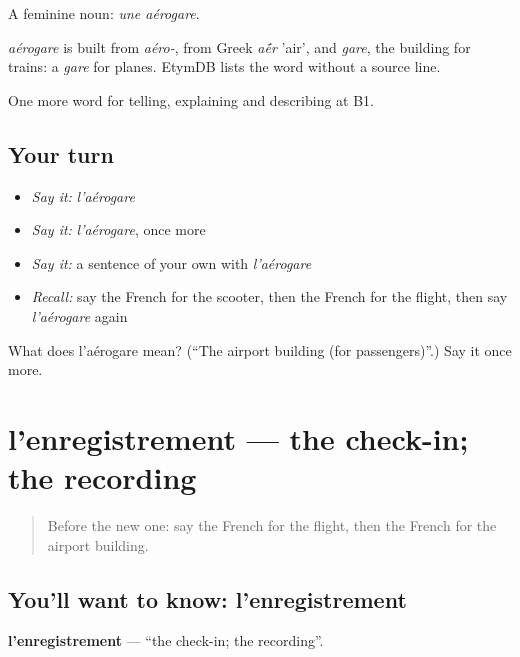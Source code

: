 A feminine noun: \emph{une aérogare}.

\begin{cousinweb}
\emph{aérogare} is built from \emph{aéro-}, from Greek \emph{a\'{\={e}}r} 'air', and \emph{gare}, the building for trains: a \emph{gare} for planes. EtymDB lists the word without a source line.
\end{cousinweb}

\begin{grammarlens}[title={What you've built}]
One more word for telling, explaining and describing at B1.
\end{grammarlens}

\subsection*{Your turn}
\begin{itemize}
\raggedright
  \item \emph{Say it:} \emph{l'aérogare}
  \item \emph{Say it:} \emph{l'aérogare}, once more
  \item \emph{Say it:} a sentence of your own with \emph{l'aérogare}
  \item \emph{Recall:} say the French for the scooter, then the French for the flight, then say \emph{l'aérogare} again
\end{itemize}

\begin{tcolorbox}[breakable,colback=teal!4,colframe=teal!35!black,title={Before you move on}]
What does l'aérogare mean? (\textquotedblleft{}The airport building (for passengers)\textquotedblright{}.) Say it once more.
\end{tcolorbox}
\section[l'enregistrement]{l'enregistrement — the check-in; the recording}

\label{lesson:FR-C416-enregistrement}



\begin{quote}
Before the new one: say the French for the flight, then the French for the airport building.
\end{quote}

\subsection*{You'll want to know: l'enregistrement}
\textbf{l'enregistrement} — \textquotedblleft{}the check-in; the recording\textquotedblright{}.

